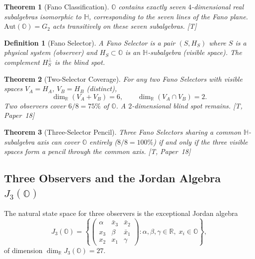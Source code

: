 \documentclass[11pt, a4paper]{article}
\newtheorem{theorem}{Theorem}
\newtheorem{definition}{Definition}
\newcommand{\R}{\mathbb{R}}
\newcommand{\Hq}{\mathbb{H}}
\newcommand{\Oct}{\mathbb{O}}
\begin{document}
\begin{theorem}[Fano Classification]
\label{thm:fano_classification}
$\Oct$ contains exactly seven $4$-dimensional real subalgebras
isomorphic to $\Hq$, corresponding to the seven lines of the Fano
plane. $\mathrm{Aut}(\Oct) = G_2$ acts transitively on these seven
subalgebras. [T]
\end{theorem}

\begin{definition}[Fano Selector]
\label{def:fano_selector}
A \emph{Fano Selector} is a pair $(S, H_S)$ where $S$ is a physical
system (observer) and $H_S \subset \Oct$ is an $\Hq$-subalgebra
(visible space). The complement $H_S^\perp$ is the \emph{blind spot}.
\end{definition}

\begin{theorem}[Two-Selector Coverage]
\label{thm:two_selector}
For any two Fano Selectors with visible spaces $V_A = H_A$,
$V_B = H_B$ (distinct),
\begin{equation}
\dim_\R(V_A + V_B) = 6, \qquad \dim_\R(V_A \cap V_B) = 2.
\end{equation}
Two observers cover $6/8 = 75\%$ of $\Oct$. A $2$-dimensional blind
spot remains. [T, Paper~18]
\end{theorem}

\begin{theorem}[Three-Selector Pencil]
\label{thm:three_selector}
Three Fano Selectors sharing a common $\Hq$-subalgebra axis can
cover $\Oct$ entirely ($8/8 = 100\%$) if and only if the three
visible spaces form a pencil through the common axis. [T, Paper~18]
\end{theorem}

\subsection{Three Observers and the Jordan Algebra $J_3(\Oct)$}

The natural state space for three observers is the exceptional
Jordan algebra
\begin{equation}
J_3(\Oct) = \left\{ \begin{pmatrix} \alpha & \bar{x}_3 & \bar{x}_2 \\
x_3 & \beta & \bar{x}_1 \\ x_2 & x_1 & \gamma \end{pmatrix}
: \alpha, \beta, \gamma \in \R,\; x_i \in \Oct \right\},
\end{equation}
of dimension $\dim_\R J_3(\Oct) = 27$.
\end{document}
